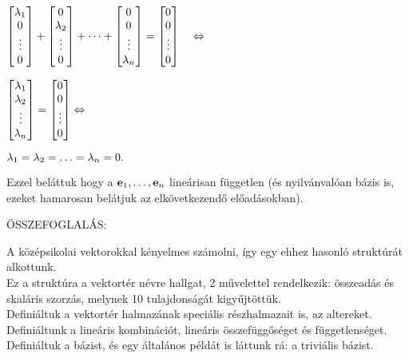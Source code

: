 \documentclass[a4paper,11.5pt]{article}
\begin{document}
{	$\begin{bmatrix}
	\l_1\s \\
	0\s \\
	\vdots\\
	0\s \\
	\end{bmatrix}+
	\begin{bmatrix}
	0\s \\
	\l_2\s \\
	\vdots\\
	0\s \\
	\end{bmatrix}+ \dots+
	\begin{bmatrix}
	0\s \\
	0\s \\
	\vdots\\
	\l_n\s \\
	\end{bmatrix}=
	\begin{bmatrix}
	0\s \\
	0\s \\
	\vdots\\
	0\s \\
	\end{bmatrix} \quad \Leftrightarrow$
	
	$\begin{bmatrix}
	\l_1\s \\
	\l_2\s \\
	\vdots\\
	\l_n\s \\
	\end{bmatrix}=
	\begin{bmatrix}
	0\s \\
	0\s \\
	\vdots\\
	0\s \\
	\end{bmatrix} \Leftrightarrow $
	
	\medskip
	$\lambda_1=\lambda_2=\ldots=\lambda_n=0.$
	\par}
	
	Ezzel beláttuk hogy a $\textbf{e}_1, \ldots ,\textbf{e}_n$ lineárisan független (és nyilvánvalóan bázis is, ezeket hamarosan belátjuk az elkövetkezendő előadásokban).
	
	\pagebreak
	\begin{center}
		ÖSSZEFOGLALÁS:
	\end{center}
	
	
		 \noindent A középsikolai vektorokkal kényelmes számolni, így egy ehhez hasonló struktúrát alkottunk.\\
		 Ez a struktúra a vektortér névre hallgat, 2 művelettel rendelkezik: összeadás és skaláris szorzás, melynek 10 tulajdonságát kigyűjtöttük.\\
		 Definiáltuk a vektortér halmazának speciális részhalmazait is, az altereket.\\
		 Definiáltunk a lineáris kombinációt, lineáris összefüggőséget és függetlenséget.\\
		 Definiáltuk a bázist, és egy általános példát is láttunk rá: a triviális bázist.
	
\end{document}

